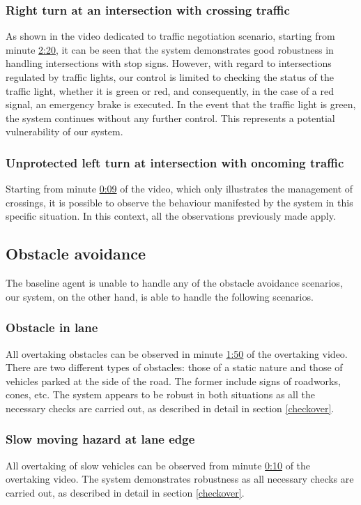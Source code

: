 \documentclass{article}
\begin{document}
\subsubsection{Right turn at an intersection with crossing traffic}
As shown in the video dedicated to traffic negotiation scenario, starting from minute \href{https://youtu.be/d2ESc0bXmmg?t=140}{2:20}, it can be seen that the system demonstrates good robustness in handling intersections with stop signs. However, 
with regard to intersections regulated by traffic lights, our control is limited to checking the status of the traffic light, whether it is green or red, and 
consequently, in the case of a red signal, an emergency brake is executed. In the event that the traffic light is green, the system continues without any 
further control. This represents a potential vulnerability of our system.
\subsubsection{Unprotected left turn at intersection with oncoming traffic}
Starting from minute \href{https://youtu.be/d2ESc0bXmmg?t=9}{0:09} of the video, which only illustrates the management of crossings, it is possible to observe the behaviour manifested by the system in 
this specific situation. In this context, all the observations previously made apply.

\subsection{Obstacle avoidance}
The baseline agent is unable to handle any of the obstacle avoidance scenarios, our system, on the other hand, is able to handle the following scenarios.
\subsubsection{Obstacle in lane}
All overtaking obstacles can be observed in minute \href{https://youtu.be/vDg-9poUQ9k?t=110}{1:50} of the overtaking video. There are two different types of obstacles: those of a static nature and 
those of vehicles parked at the side of the road. The former include signs of roadworks, cones, etc. The system appears to be robust in both situations 
as all the necessary checks are carried out, as described in detail in section \ref{checkover}.
\subsubsection{Slow moving hazard at lane edge}
All overtaking of slow vehicles can be observed from minute \href{https://youtu.be/vDg-9poUQ9k?t=10}{0:10} of the overtaking video. The system demonstrates robustness as all necessary checks are 
carried out, as described in detail in section \ref{checkover}.
\end{document}
